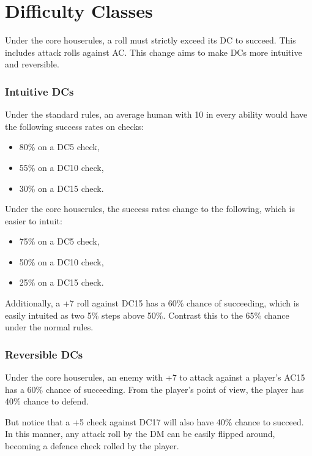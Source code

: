 \documentclass[letterpaper,twocolumn,openany,nodeprecatedcode,bg=print]{dndbook}
\begin{document}
\twocolumn




\chapter{Difficulty Classes}
\label{difficulty-classes}

Under the core houserules, a roll must strictly exceed its DC to succeed. 
This includes attack rolls against AC. 
This change aims to make DCs more intuitive and reversible.

\subsection{Intuitive DCs}

Under the standard rules, an average human with 10 in every ability would have the following success rates on checks:

\begin{itemize}
\item 80\% on a DC5 check,
\item 55\% on a DC10 check,
\item 30\% on a DC15 check.
\end{itemize}

\noindent Under the core houserules, the success rates change to the following, which is easier to intuit:

\begin{itemize}
\item 75\% on a DC5 check,
\item 50\% on a DC10 check,
\item 25\% on a DC15 check.
\end{itemize}

\noindent Additionally, a +7 roll against DC15 has a 60\% chance of succeeding, which is easily intuited as two 5\% steps above 50\%. 
Contrast this to the 65\% chance under the normal rules.

\subsection{Reversible DCs}
Under the core houserules, an enemy with +7 to attack against a player's AC15 has a 60\% chance of succeeding. 
From the player's point of view, the player has 40\% chance to defend. 

But notice that a +5 check against DC17 will also have 40\% chance to succeed. 
In this manner, any attack roll by the DM can be easily flipped around, becoming a defence check rolled by the player.
\end{document}
